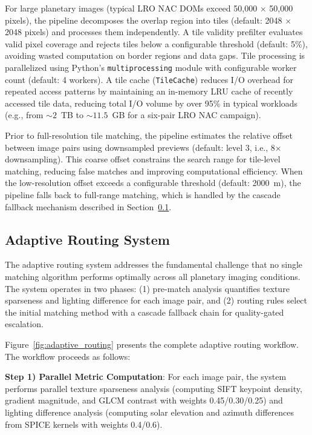 \documentclass[lettersize,journal]{IEEEtran}
\begin{document}
For large planetary images (typical LRO NAC DOMs exceed 50,000 $\times$ 50,000 pixels), the pipeline decomposes the overlap region into tiles (default: 2048 $\times$ 2048 pixels) and processes them independently. A tile validity prefilter evaluates valid pixel coverage and rejects tiles below a configurable threshold (default: 5\%), avoiding wasted computation on border regions and data gaps. Tile processing is parallelized using Python's \texttt{multiprocessing} module with configurable worker count (default: 4 workers). A tile cache (\texttt{TileCache}) reduces I/O overhead for repeated access patterns by maintaining an in-memory LRU cache of recently accessed tile data, reducing total I/O volume by over 95\% in typical workloads (e.g., from ${\sim}2$~TB to ${\sim}11.5$~GB for a six-pair LRO NAC campaign).

Prior to full-resolution tile matching, the pipeline estimates the relative offset between image pairs using downsampled previews (default: level 3, i.e., 8$\times$ downsampling). This coarse offset constrains the search range for tile-level matching, reducing false matches and improving computational efficiency. When the low-resolution offset exceeds a configurable threshold (default: 2000~m), the pipeline falls back to full-range matching, which is handled by the cascade fallback mechanism described in Section~\ref{sec:adaptive_routing}.

\subsection{Adaptive Routing System}\label{sec:adaptive_routing}

The adaptive routing system addresses the fundamental challenge that no single matching algorithm performs optimally across all planetary imaging conditions. The system operates in two phases: (1) pre-match analysis quantifies texture sparseness and lighting difference for each image pair, and (2) routing rules select the initial matching method with a cascade fallback chain for quality-gated escalation.

Figure~\ref{fig:adaptive_routing} presents the complete adaptive routing workflow. The workflow proceeds as follows:

\textbf{Step 1) Parallel Metric Computation}: For each image pair, the system performs parallel texture sparseness analysis (computing SIFT keypoint density, gradient magnitude, and GLCM contrast with weights 0.45/0.30/0.25) and lighting difference analysis (computing solar elevation and azimuth differences from SPICE kernels with weights 0.4/0.6).
\end{document}
